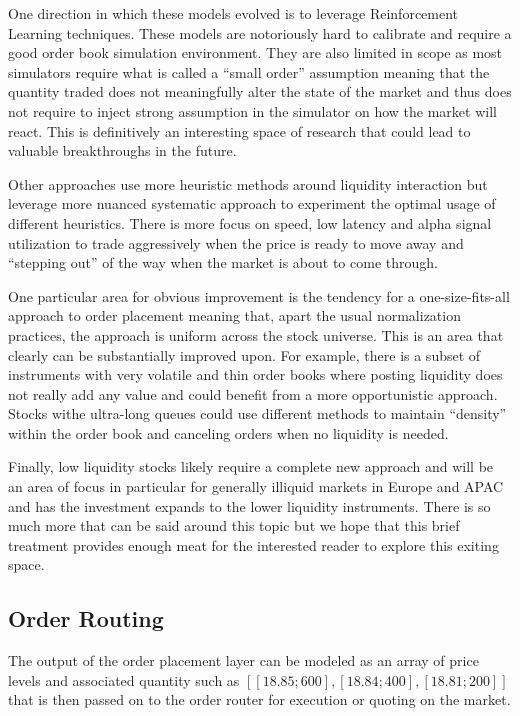 One direction in which these models evolved is to leverage Reinforcement Learning techniques. These models are notoriously hard to calibrate and require a good order book simulation environment. They are also limited in scope as most simulators require what is called a ``small order'' assumption meaning that the quantity traded does not meaningfully alter the state of the market and thus does not require to inject strong assumption in the simulator on how the market will react. This is definitively an interesting space of research that could lead to valuable breakthroughs in the future.


Other approaches use more heuristic methods around liquidity interaction but leverage more nuanced systematic approach to experiment the optimal usage of different heuristics. There is more focus on speed, low latency and alpha signal utilization to trade aggressively when the price is ready to move away and ``stepping out'' of the way when the market is about to come through.


One particular area for obvious improvement is the tendency for a one-size-fits-all approach to order placement meaning that, apart the usual normalization practices, the approach is uniform across the stock universe. This is an area that clearly can be substantially improved upon. For example, there is a subset of instruments with very volatile and thin order books where posting liquidity does not really add any value and could benefit from a more opportunistic approach. Stocks withe ultra-long queues could use different methods to maintain ``density'' within the order book and canceling orders when no liquidity is needed.


Finally, low liquidity stocks likely require a complete new approach and will be an area of focus in particular for generally illiquid markets in Europe and APAC and has the investment expands to the lower liquidity instruments. There is so much more that can be said around this topic but we hope that this brief treatment provides enough meat for the interested reader to explore this exiting space.



\subsection{Order Routing}

The output of the order placement layer can be modeled as an array of price levels and associated quantity such as $[ [18.85 ; 600], [18.84 ; 400], [18.81 ; 200] ]$ that is then passed on to the order router for execution or quoting on the market.


